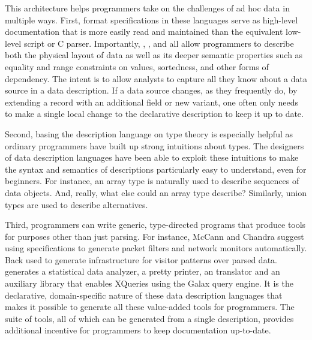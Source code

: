 This architecture helps programmers take on the
challenges of ad hoc data in multiple ways.
First, format specifications in these languages serve as high-level
documentation that is more easily read and
maintained than the equivalent low-level \perl{} script or C parser.
Importantly, \datascript{}, \packettypes{}, and \pads{} all
allow programmers to describe both the physical layout of data
as well as its deeper semantic properties such as equality and range 
constraints on values, sortedness, and other forms of dependency.
The intent is to allow analysts to capture all they know about
a data source in a data description.  If a data source changes,
as they frequently do, by extending a record with an additional field or new
variant, one often only needs to make a single local change to
the declarative description to keep it up to date.  

Second, basing the description language on type theory is especially helpful as
ordinary programmers have built up strong intuitions about types.  
The designers of data description languages
have been able to exploit these intuitions to make the syntax and
semantics of descriptions
particularly easy to understand, even for beginners.  For instance,
an array type is naturally used to describe sequences of data objects.
And, really, what else could an array type describe?  Similarly,
union types are used to describe alternatives.

Third, programmers can write generic, type-directed programs that
produce tools for purposes other than just parsing.  For instance,
McCann and Chandra suggest using \packettypes{} specifications to
generate packet filters and network monitors automatically.  Back used
\datascript{} to generate infrastructure for visitor patterns over
parsed data. \pads{} generates a statistical data analyzer, a pretty
printer, an \xml{} translator and an auxiliary library that enables
XQueries using the Galax query engine\cite{galax}.  It is the
declarative, domain-specific nature of these data description
languages that makes it possible to generate all these value-added
tools for programmers.  The suite of tools, all of which can be
generated from a single description, provides additional incentive for
programmers to keep documentation up-to-date.


